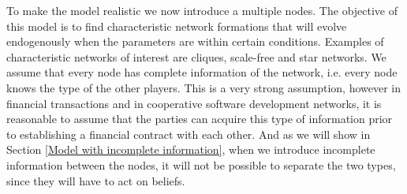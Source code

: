 To make the model realistic we now introduce a multiple nodes.  The objective of this model is to find characteristic network formations that will evolve endogenously when the parameters are within certain conditions. 
Examples of characteristic networks of interest are cliques, scale-free and star networks.
We assume that every node has complete information of the network, i.e. every node knows the type of the other players. This is a very strong assumption, however in financial transactions and in cooperative software development networks, it is reasonable to assume that the parties can acquire this type of information prior to establishing a financial contract with each other. And as we will show in Section \ref{Model with incomplete information}, when we introduce incomplete information between the nodes, it will not be possible to separate the two types, since they will have to act on beliefs.
